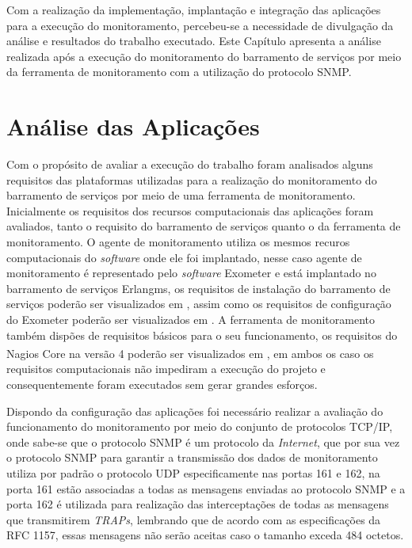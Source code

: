 \label{analise_monitoramento_servicos}

Com a realização da implementação, implantação e integração das aplicações para a execução do monitoramento, percebeu-se a necessidade de divulgação da análise e resultados do trabalho executado. Este Capítulo apresenta a análise realizada após a execução do monitoramento do barramento de serviços por meio da ferramenta de monitoramento com a utilização do protocolo \acrshort{SNMP}.


\section{Análise das Aplicações}
\label{analise}
Com o propósito de avaliar a execução do trabalho foram analisados alguns requisitos das plataformas utilizadas para a realização do monitoramento do barramento de serviços por meio de uma ferramenta de monitoramento. Inicialmente os requisitos dos recursos computacionais das aplicações foram avaliados, tanto o requisito do barramento de serviços quanto o da ferramenta de monitoramento. O agente de monitoramento utiliza os mesmos recuros computacionais do \textit{software} onde ele foi implantado, nesse caso agente de monitoramento é representado pelo \textit{software} Exometer e está implantado no barramento de serviços Erlangms, os requisitos de instalação do barramento de serviços poderão ser visualizados em \cite{erlangms_gitHub}, assim como os requisitos de configuração do Exometer poderão ser visualizados em \cite{exometer_gitHub} . A ferramenta de monitoramento também dispões de requisitos básicos para o seu funcionamento, os requisitos do Nagios Core\textsuperscript{\textregistered} na versão 4 poderão ser visualizados em \cite{nagios_core_configuration}, em ambos os caso os requisitos computacionais não impediram a execução do projeto e consequentemente foram executados sem gerar grandes esforços.

Dispondo da configuração das aplicações foi necessário realizar a avaliação do funcionamento do monitoramento por meio do conjunto de protocolos TCP/IP, onde sabe-se que o protocolo \acrshort{SNMP} é um protocolo da \textit{Internet}, que por sua vez o protocolo \acrshort{SNMP} para garantir a transmissão dos dados de monitoramento utiliza por padrão o protocolo UDP especificamente nas portas 161 e 162, na porta 161 estão associadas a todas as mensagens enviadas ao protocolo \acrshort{SNMP} e a porta 162 é utilizada para realização das interceptações de todas as mensagens que transmitirem \textit{TRAPs}, lembrando que de acordo com as especificações da RFC 1157, essas mensagens não serão aceitas caso o tamanho exceda 484 octetos\cite{Schoffstall}. 

